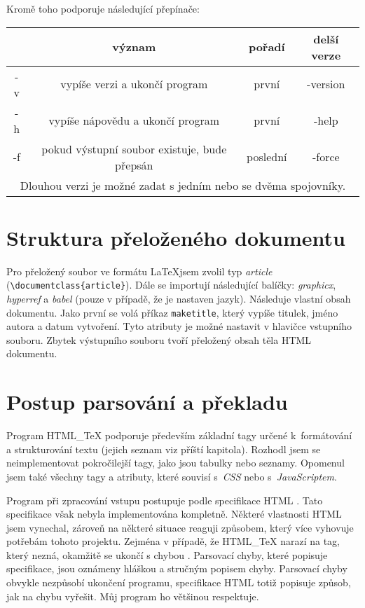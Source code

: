 \documentclass[a4paper,12pt]{article}
\newcommand{\zl}{\textbackslash}
\begin{document}
	Kromě toho podporuje následující přepínače:\\
	\begin{tabular}{|c|c|c|c|}
		\hline
		& \textbf{význam} & \textbf{pořadí} & \textbf{delší verze} \\
		\hline
		-v       & vypíše verzi a ukončí program & první & -version \\
		\hline
		-h       & vypíše nápovědu a ukončí program & první & -help \\
		\hline
		-f       & pokud výstupní soubor existuje, bude přepsán & poslední & -force \\
		\hline
		\multicolumn{4}{c}{Dlouhou verzi je možné zadat s jedním nebo se dvěma spojovníky.}
	\end{tabular}
	
	\section{Struktura přeloženého dokumentu}
	Pro přeložený soubor ve formátu \LaTeX jsem zvolil typ \textit{article} (\texttt{\zl document\-class\{article\}}). Dále se importují následující balíčky: \textit{graphicx}, \textit{hyperref} a \textit{babel} (pouze v případě, že je nastaven jazyk). Následuje vlastní obsah dokumentu. Jako první se volá příkaz \texttt{maketitle}, který vypíše titulek, jméno autora a datum vytvoření. Tyto atributy je možné nastavit v hlavičce vstupního souboru. Zbytek výstupního souboru tvoří přeložený obsah těla HTML dokumentu.
	
	\section{Postup parsování a překladu}
	Program HTML\_TeX podporuje především základní tagy určené k~formá\-tování a strukturování textu (jejich seznam viz příští kapitola). Rozhodl jsem se
	neimplementovat pokročilejší tagy, jako jsou tabulky nebo seznamy. Opomenul jsem
	také všechny tagy a atributy, které souvisí s~\textit{CSS} nebo
	\mbox{s~\textit{JavaScriptem}}.

	Program při zpracování vstupu postupuje podle specifikace HTML \cite{specifikace}.
	Tato specifikace však nebyla implementována kompletně. Některé vlastnosti HTML jsem vynechal, zároveň na některé situace reaguji způsobem, který více vyhovuje potřebám tohoto projektu. Zejména v případě, že HTML\_TeX narazí na tag, který nezná, okamžitě se ukončí s chybou	\textit{}. Parsovací chyby, které popisuje specifikace, jsou oznámeny hláškou \textit{} a stručným popisem chyby. Parsovací chyby obvykle nezpůsobí ukončení programu, specifikace HTML totiž popisuje způsob, jak na chybu vyřešit. Můj program ho většinou respektuje.
	
\end{document}

